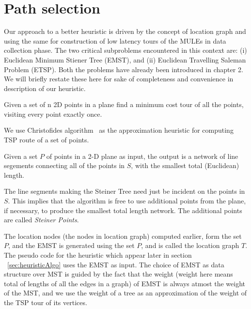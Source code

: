 \chapter{Path selection} \label{chap:steiner}


Our approach to a better heuristic is driven by the concept of location graph and using the same for construction of low latency tours of the MULEs in data collection phase. The two critical subproblems encountered in this context are: 
(i) Euclidean Minimum Stiener Tree (EMST), and (ii)  Euclidean Travelling Saleman Problem (ETSP). Both the problems have already been introduced
in chapter 2. We will briefly restate these here for
sake of completeness and convenience in description of our heuristic.

\begin{definition}
Given a set of n 2D points in a plane find a minimum cost tour of all
the points, visiting every point exactly once.
\end{definition}
We use Christofides algorithm~\cite{christofides} as the approximation heuristic for computing TSP route of a set of points.

\begin{definition}
Given a set $P$ of points in a 2-D plane as input, the output is a network of line segements connecting all of the points in $S$, with the smallest total (Euclidean) length.
\end{definition}
The line segments making the Steiner Tree need just be incident on the points in $S$. This implies that the algorithm is free to use additional points from the plane, if necessary, to produce the smallest total length network. The additional points are called {\em Steiner Points}.

The location nodes (the nodes in location graph) computed earlier, form the set $P$, and the EMST is generated using the set $P$, and is called the location graph $T$. The pseudo code for the heuristic which appear later in section ~\ref{sec:heuristicAlgo} uses the EMST as input. The choice of EMST as data structure over MST is guided by the fact that the weight (weight here means total of lengths of all the edges in a graph) of EMST is always atmost the weight of the MST, and we use the weight of a tree as an approximation of the weight of the TSP tour of its vertices.

